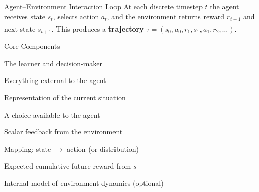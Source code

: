 \begin{v3topic}{Agent--Environment Interaction Loop}
        At each discrete timestep $t$ the agent receives state $s_t$, selects
        action $a_t$, and the environment returns reward $r_{t+1}$ and next
        state $s_{t+1}$. This produces a \textbf{trajectory}
        $\tau = (s_0, a_0, r_1, s_1, a_1, r_2, \ldots)$.%
        \textsuperscript{\cite[][p.~325]{hurbansGrokkingArtificialIntelligence2020}}
\visualseparator
        \begin{center}
\label{fig:rl-agent-environment-loop}
        \end{center}

\end{v3topic}
\begin{v3topic}{Core Components}
        \begin{description}[leftmargin=0.5cm, labelindent=0pt]
            \item[\textbf{Agent}] The learner and decision-maker
            \item[\textbf{Environment}] Everything external to the agent
            \item[\textbf{State $s$}] Representation of the current situation
            \item[\textbf{Action $a$}] A choice available to the agent
            \item[\textbf{Reward $r$}] Scalar feedback from the environment
            \item[\textbf{Policy $\pi$}] Mapping: state $\to$ action (or distribution)
            \item[\textbf{Value $V(s)$}] Expected cumulative future reward from $s$
            \item[\textbf{Model}] Internal model of environment dynamics (optional)
        \end{description}
        \textsuperscript{\cite[][p.~326]{hurbansGrokkingArtificialIntelligence2020}}

\end{v3topic}
